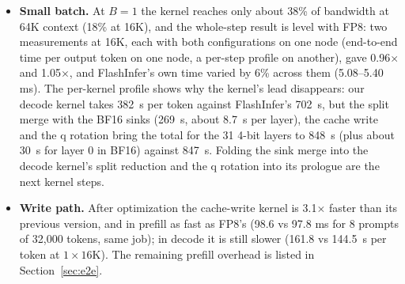 \documentclass[11pt]{article}
\begin{document}
\begin{itemize}
  \item \textbf{Small batch.} At $B = 1$ the kernel reaches only about 38\% of bandwidth at 64K context (18\% at 16K), and the whole-step result is level with FP8: two measurements at 16K, each with both configurations on one node (end-to-end time per output token on one node, a per-step profile on another), gave 0.96$\times$ and 1.05$\times$, and FlashInfer's own time varied by 6\% across them (5.08--5.40 ms). The per-kernel profile shows why the kernel's lead disappears: our decode kernel takes 382~\textmu s per token against FlashInfer's 702~\textmu s, but the split merge with the BF16 sinks (269~\textmu s, about 8.7~\textmu s per layer), the cache write and the q rotation bring the total for the 31 4-bit layers to 848~\textmu s (plus about 30~\textmu s for layer 0 in BF16) against 847~\textmu s. Folding the sink merge into the decode kernel's split reduction and the q rotation into its prologue are the next kernel steps.
  \item \textbf{Write path.} After optimization the cache-write kernel is 3.1$\times$ faster than its previous version, and in prefill as fast as FP8's (98.6 vs 97.8 ms for 8 prompts of 32,000 tokens, same job); in decode it is still slower (161.8 vs 144.5~\textmu s per token at $1 \times 16$K). The remaining prefill overhead is listed in Section~\ref{sec:e2e}.

\end{itemize}
\end{document}
